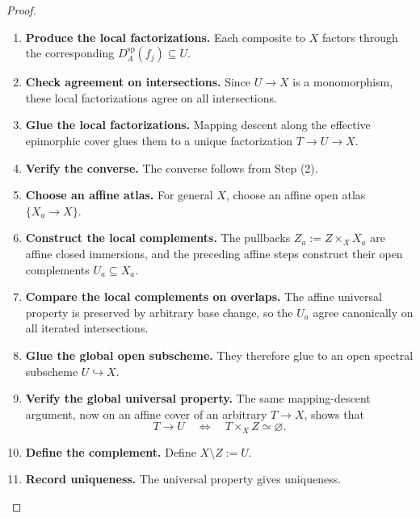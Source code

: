 \begin{proof}
\begin{enumerate}[label=\textup{(\arabic*)}]
    \item \textbf{Produce the local factorizations.}
    Each composite to \(X\) factors through the
    corresponding \(D_A^{\mathrm{sp}}(f_j)\subseteq U\).

    \item \textbf{Check agreement on intersections.}
    Since \(U\to X\)
    is a monomorphism, these local factorizations agree on all intersections.

    \item \textbf{Glue the local factorizations.}
    Mapping descent along the effective epimorphic cover glues them to a
    unique factorization \(T\to U\to X\).

    \item \textbf{Verify the converse.}
    The converse follows from
    Step \textup{(2)}.

    \item \textbf{Choose an affine atlas.}
    For general \(X\), choose an affine open atlas
    \(\{X_a\to X\}\).

    \item \textbf{Construct the local complements.}
    The pullbacks \(Z_a:=Z\times_XX_a\) are affine
    closed immersions, and the preceding affine steps construct their
    open complements \(U_a\subseteq X_a\).

    \item \textbf{Compare the local complements on overlaps.}
    The affine universal property
    is preserved by arbitrary base change, so the \(U_a\) agree canonically
    on all iterated intersections.

    \item \textbf{Glue the global open subscheme.}
    They therefore glue to an open spectral
    subscheme \(U\hookrightarrow X\).

    \item \textbf{Verify the global universal property.}
    The same mapping-descent argument,
    now on an affine cover of an arbitrary \(T\to X\), shows that
    \[
        T\to U
        \quad\Longleftrightarrow\quad
        T\times_XZ\simeq\varnothing.
    \]

    \item \textbf{Define the complement.}
    Define \(X\setminus Z:=U\).

    \item \textbf{Record uniqueness.}
    The universal property gives uniqueness.
\end{enumerate}
\end{proof}

